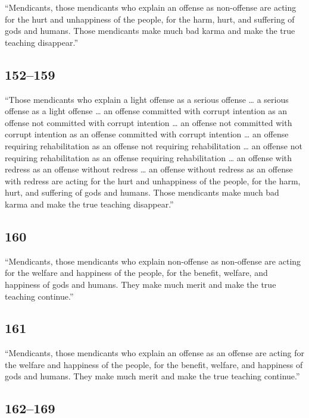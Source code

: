 \documentclass[12pt,openany]{book}%
\begin{document}
“Mendicants, those mendicants who explain an offense as non-offense are acting for the hurt and unhappiness of the people, for the harm, hurt, and suffering of gods and humans. Those mendicants make much bad karma and make the true teaching disappear.” 

\subsection*{152–159 }

“Those mendicants who explain a light offense as a serious offense … a serious offense as a light offense … an offense committed with corrupt intention as an offense not committed with corrupt intention … an offense not committed with corrupt intention as an offense committed with corrupt intention … an offense requiring rehabilitation as an offense not requiring rehabilitation … an offense not requiring rehabilitation as an offense requiring rehabilitation … an offense with redress as an offense without redress … an offense without redress as an offense with redress are acting for the hurt and unhappiness of the people, for the harm, hurt, and suffering of gods and humans. Those mendicants make much bad karma and make the true teaching disappear.” 

\subsection*{160 }

“Mendicants, those mendicants who explain non-offense as non-offense are acting for the welfare and happiness of the people, for the benefit, welfare, and happiness of gods and humans. They make much merit and make the true teaching continue.” 

\subsection*{161 }

“Mendicants, those mendicants who explain an offense as an offense are acting for the welfare and happiness of the people, for the benefit, welfare, and happiness of gods and humans. They make much merit and make the true teaching continue.” 

\subsection*{162–169 }
\end{document}

